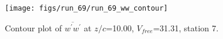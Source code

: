 \begin{figure}[H]
\centering
\texttt{[image: figs/run\_69/run\_69\_ww\_contour]}
\caption{Contour plot of $\overline{w^\prime w^\prime}$ at $z/c$=10.00, $V_{free}$=31.31, station 7.}
\label{fig:run_69_ww_contour}
\end{figure}


